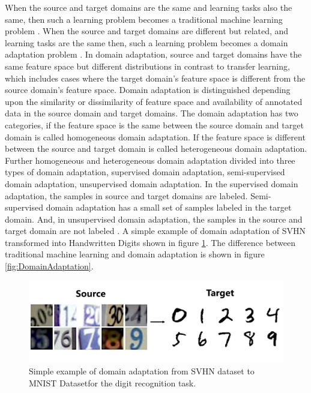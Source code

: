 When the source and target domains are the same and learning tasks also the same, then such a learning problem becomes a traditional machine learning problem \cite{5288526}. When the source and target domains are different but related, and learning tasks are the same then, such a learning problem becomes a domain adaptation problem \cite{5288526}. In domain adaptation, source and target domains have the same feature space but different distributions in contrast to transfer learning, which includes cases where the target domain's feature space is different from the source domain's feature space. Domain adaptation is distinguished depending upon the similarity or dissimilarity of feature space and availability of annotated data in the source domain and target domains. The domain adaptation has two categories, if the feature space is the same between the source domain and target domain is called homogeneous domain adaptation. If the feature space is different between the source and target domain is called heterogeneous domain adaptation. Further homogeneous and heterogeneous domain adaptation divided into three types of domain adaptation, supervised domain adaptation, semi-supervised domain adaptation, unsupervised domain adaptation. In the supervised domain adaptation, the samples in source and target domains are labeled. Semi-supervised domain adaptation has a small set of samples labeled in the target domain. And, in unsupervised domain adaptation, the samples in the source and target domain are not labeled \cite{5288526}. A simple example of domain adaptation of  \ac{SVHN} transformed into Handwritten Digits shown in figure \ref{fig:DA}. The difference between traditional machine learning and domain adaptation is shown in figure \ref{fig:DomainAdaptation}.


\begin{figure}[H]
        \begin{center}
 	    \includegraphics[scale=0.15]{images/Introduction/DA.png}
	    \caption[Simple example of domain adaptation from \ac{SVHN} dataset to \ac{MNIST} Dataset for the digit recognition task.]{Simple example of domain adaptation from \ac{SVHN} dataset \cite{37648} to \ac{MNIST} Dataset\footnotemark for the digit recognition task.\footnotemark}
	    \label{fig:DA}
	    \end{center}
\end{figure}

